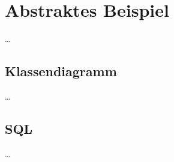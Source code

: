 
\chapter{Abstraktes Beispiel} %

\label{Chapter2} %

…

\section{Klassendiagramm}

…

\section{SQL}

…
